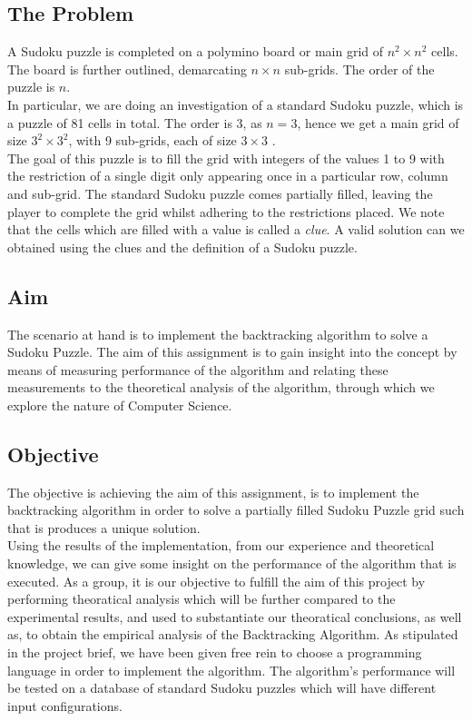 \documentclass[12pt]{article}
\begin{document}
\subsection{The Problem}
A Sudoku puzzle is completed on a polymino board or main grid of $ n^2 \times n^2$ cells. The board is further outlined, demarcating $n \times n $ sub-grids. The order of the puzzle is $n$. \\
In particular, we are doing an investigation of a standard Sudoku puzzle, which is a puzzle of 81 cells in total. The order is 3, as $n = 3$, hence we get a main grid of size $3^2\times 3^2$, with 9 sub-grids, each of size $ 3\times 3 $ .\\
The goal of this puzzle is to fill the grid with integers of the values 1 to 9 with the restriction of a single digit only appearing once in a particular row, column and sub-grid. The standard Sudoku puzzle comes partially filled, leaving the player to complete the grid whilst adhering to the restrictions placed. We note that the cells which are  filled with a value is called a \textsl{clue}. A valid solution can we obtained using the clues and the definition of a Sudoku puzzle.  
  
\subsection{Aim}
\begin{flushleft}
The scenario at hand is to implement the backtracking algorithm to solve a Sudoku Puzzle. The aim of this assignment is to gain insight into the concept by means of measuring performance of the algorithm and relating these  measurements to the theoretical analysis of the algorithm, through which we explore the nature of Computer Science. 
\end{flushleft}
\subsection{Objective}
\begin{flushleft}
The objective is achieving the aim of this assignment, is to implement the backtracking algorithm in order to solve a partially filled Sudoku Puzzle grid such that is produces a unique solution. \\
Using the results of the implementation, from our experience and theoretical knowledge, we can give some insight on the performance of the algorithm that is executed. As a group, it is our objective to fulfill the aim of this project by performing theoratical analysis which will be further compared to the experimental results, and used to substantiate our theoratical conclusions, as well as, to obtain the empirical analysis of the Backtracking Algorithm. As stipulated in the project brief, we have been given free rein to choose a programming language in order to implement the algorithm. The algorithm's performance will be tested on a database of standard Sudoku puzzles which will have different input configurations. 
\end{flushleft}	
\end{document}
